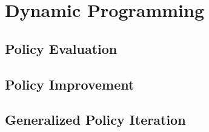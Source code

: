 \section{Dynamic Programming}
\subsection{Policy Evaluation}
\subsection{Policy Improvement}
\subsection{Generalized Policy Iteration}